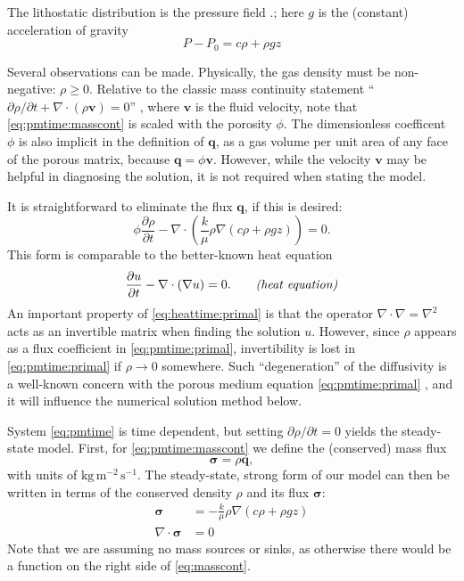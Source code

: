 \documentclass[11pt]{amsart}
\newcommand{\bq}{\mathbf{q}}
\newcommand{\bv}{\mathbf{v}}
\newcommand{\bsigma}{\bm{\sigma}}
\newcommand{\Div}{\nabla\cdot}
\newcommand{\grad}{\nabla}
\begin{document}
The lithostatic distribution is the pressure field .; here $g$ is the (constant) acceleration of gravity\begin{equation}
P-P_0 = c\rho+\rho g z \label{eq:drivingpressure}
\end{equation}


Several observations can be made.  Physically, the gas density must be non-negative: $\rho\ge 0$.  Relative to the classic mass continuity statement ``$\partial\rho/\partial t + \Div(\rho \bv)=0$'' \citep[for example]{Tadmor2012}, where $\bv$ is the fluid velocity, note that \eqref{eq:pmtime:masscont} is scaled with the porosity $\phi$.  The dimensionless coefficent $\phi$ is also implicit in the definition of $\bq$, as a gas volume per unit area of any face of the porous matrix, because $\bq = \phi \bv$.  However, while the velocity $\bv$ may be helpful in diagnosing the solution, it is not required when stating the model.

It is straightforward to eliminate the flux $\bq$, if this is desired:
\begin{equation}
\phi \frac{\partial \rho}{\partial t} - \Div \left(\frac{k}{\mu} \rho \grad\left(c \rho + \rho g z\right)\right) = 0. \label{eq:pmtime:primal}
\end{equation}
This form is comparable to the better-known heat equation
\begin{equation}
\frac{\partial u}{\partial t} - \Div(\grad u) = 0. \qquad \text{\emph{(heat equation)}}\label{eq:heattime:primal}
\end{equation}
An important property of \eqref{eq:heattime:primal} is that the operator $\Div \grad = \grad^2$ acts as an invertible matrix when finding the solution $u$.  However, since $\rho$ appears as a flux coefficient in \eqref{eq:pmtime:primal}, invertibility is lost in \eqref{eq:pmtime:primal} if $\rho\to 0$ somewhere.  Such ``degeneration'' of the diffusivity is a well-known concern with the porous medium equation \eqref{eq:pmtime:primal} \citep[for example]{Vazquez2007}, and it will influence the numerical solution method below.

System \eqref{eq:pmtime} is time dependent, but setting $\partial \rho/\partial t = 0$ yields the steady-state model.  First, for \eqref{eq:pmtime:masscont} we define the (conserved) mass flux
\begin{equation}
\bsigma = \rho \bq, \label{eq:massflux}
\end{equation}
with units of $\text{kg}\,\text{m}^{-2}\,\text{s}^{-1}$.  The steady-state, strong form of our model can then be written in terms of the conserved density $\rho$ and its flux $\bsigma$:
\begin{subequations}
\label{eq:pm:strong}
\begin{align}
\bsigma &= - \frac{k}{\mu} \rho \grad\left(c \rho + \rho g z\right) \label{eq:darcy} \\
\Div \bsigma &= 0 \label{eq:masscont}
\end{align}
\end{subequations}
Note that we are assuming no mass sources or sinks, as otherwise there would be a function on the right side of \eqref{eq:masscont}.
\end{document}
